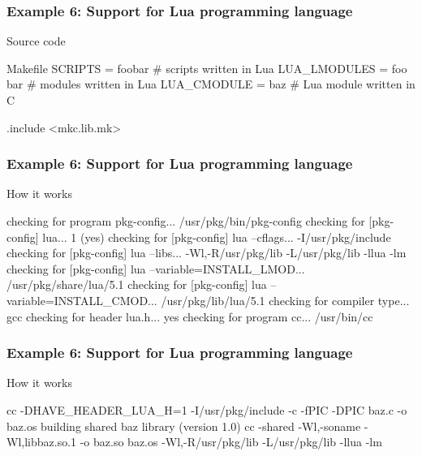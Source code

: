 \documentclass[hyperref={colorlinks=true}]{beamer}
\begin{document}
\begin{frame}[fragile]
  \frametitle{Example 6: Support for Lua programming language}

  \begin{block}{Source code}
  \begin{Code}{Makefile}
SCRIPTS =       foobar  # scripts written in Lua
LUA\_LMODULES =  foo bar # modules written in Lua
LUA\_CMODULE =   baz     # Lua module written in C

.include <mkc.lib.mk>
  \end{Code}
  \end{block}
\end{frame}

\begin{frame}[fragile]
  \frametitle{Example 6: Support for Lua programming language}

  \begin{block}{How it works}
  \begin{CodeNoLabel}
checking for program pkg-config...
   /usr/pkg/bin/pkg-config
checking for [pkg-config] lua... 1 (yes)
checking for [pkg-config] lua --cflags...
   -I/usr/pkg/include
checking for [pkg-config] lua --libs...
   -Wl,-R/usr/pkg/lib -L/usr/pkg/lib -llua -lm
checking for [pkg-config] lua --variable=INSTALL_LMOD...
   /usr/pkg/share/lua/5.1
checking for [pkg-config] lua --variable=INSTALL_CMOD...
   /usr/pkg/lib/lua/5.1
checking for compiler type... gcc
checking for header lua.h... yes
checking for program cc... /usr/bin/cc
\prompt{\$}
  \end{CodeNoLabel}
  \end{block}
\end{frame}

\begin{frame}[fragile]
  \frametitle{Example 6: Support for Lua programming language}

  \begin{block}{How it works}
  \begin{CodeNoLabel}
cc -DHAVE_HEADER_LUA_H=1 -I/usr/pkg/include
   -c -fPIC -DPIC baz.c -o baz.os
building shared baz library (version 1.0)
cc -shared -Wl,-soname -Wl,libbaz.so.1 -o baz.so  baz.os
   -Wl,-R/usr/pkg/lib -L/usr/pkg/lib -llua -lm
\prompt{\$}
  \end{CodeNoLabel}
  \end{block}
\end{frame}
\end{document}
